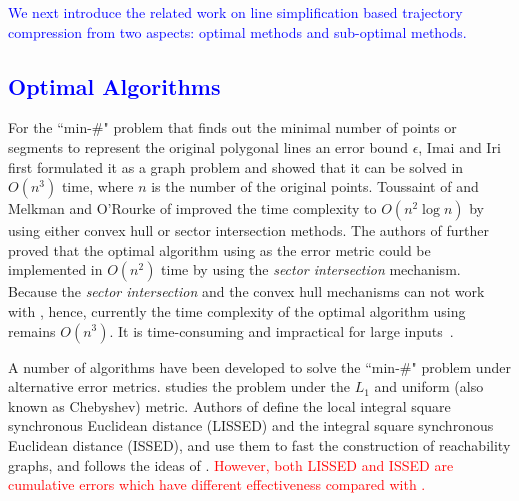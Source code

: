 \textcolor{blue}{We next introduce the related work on line simplification based trajectory compression from two aspects: optimal methods and sub-optimal methods.}

\vspace{-1ex}
\subsection{\textcolor{blue}{Optimal Algorithms}}
For the ``min-\#" problem that finds out the minimal number of points or segments to represent the original polygonal lines \wrt an error bound $\epsilon$, Imai and Iri \cite{Imai:Optimal} first formulated it as a graph problem and showed that it can be solved in  $O(n^3)$ time, where $n$ is the number of the original points.
%
Toussaint of \cite{Toussaint:Optimal} and Melkman and O'Rourke of \cite{Melkman:Optimal} improved the time complexity to $O(n^2 \log n)$ by using either convex hull or sector intersection methods.
%
The authors of \cite{Chan:Optimal} further proved that the optimal algorithm using \ped as the error metric could be implemented in $O(n^2)$ time by using the \textit{sector intersection} mechanism. 
Because the \textit{sector intersection} and the convex hull mechanisms can not work with \sed, hence, currently the time complexity of the optimal algorithm using \sed remains $O(n^3)$. 
It is time-consuming and impractical for large inputs~\cite{Heckbert:Survey}. 


A number of algorithms \cite{Agarwal:Metric, Chen:Fast, Wu:Graph} have been developed to solve the ``min-\#" problem under alternative error metrics.
\cite{Agarwal:Metric} studies the problem under the $L_1$ and uniform (also known as Chebyshev) metric. %
Authors of \cite{Chen:Fast} define the local integral square synchronous Euclidean distance (LISSED) and the integral square synchronous Euclidean distance (ISSED), and use them to fast the construction of reachability graphs, and \cite{Wu:Graph} follows the ideas of \cite{Chen:Fast}. 
\textcolor{red}{However, both LISSED and ISSED are cumulative errors which have different effectiveness compared with \sed.} 

%


